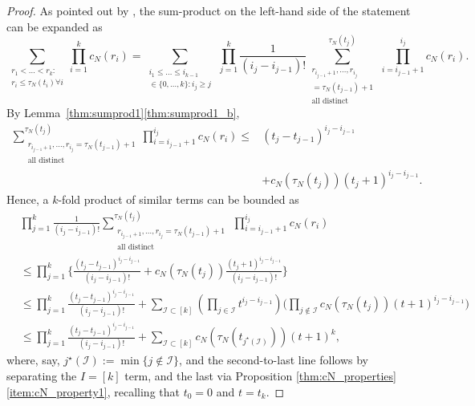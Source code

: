\documentclass[12pt,authoryear]{article}
\theoremstyle{definition}
\newcommand{\1}[1]{\mathbbm{1}_{#1}}
\begin{document}
\begin{proof}
As pointed out by \citet[p.\ 460]{mohle1999}, the sum-product on the left-hand side of the statement can be expanded as
\begin{equation*}
\sum_{\substack{r_1<\dots<r_k :\\ r_i\leq \tau_N(t_i) \forall i}} 
        \prod_{i=1}^k c_N(r_i)
= \sum_{\substack{i_1\leq \dots\leq i_{k-1}\\ \in \{0,\dots,k\} :
        i_j \geq j}} \, \prod_{j=1}^k \frac{1}{(i_j - i_{j-1})!}
        \sum_{\substack{ r_{i_{j-1}+1}, \ldots, r_{i_j} \\ = \tau_N(t_{j-1})+1 
        \\ \text{all distinct} }}^{\tau_N(t_j)}  
        \,\prod_{i=i_{j-1}+1}^{i_j} c_N(r_i) .
\end{equation*}
By Lemma~\ref{thm:sumprod1}\ref{thm:sumprod1_b},
\begin{align*}
\sum_{\substack{ r_{i_{j-1}+1}, \ldots, r_{i_j} = \tau_N(t_{j-1})+1 
        \\ \text{all distinct} }}^{\tau_N(t_j)}  
        \prod_{i=i_{j-1}+1}^{i_j} c_N(r_i) \leq{}& (t_j - t_{j-1})^{i_j - i_{j-1}} 
        \\& + c_N(\tau_N(t_j)) ( t_j +1 )^{i_j - i_{j-1}}.
\end{align*}
Hence, a $k$-fold product of similar terms can be bounded as
\begin{align*}
&\prod_{j=1}^k \frac{1}{(i_j - i_{j-1})!}
        \sum_{\substack{ r_{i_{j-1}+1}, \ldots, r_{i_j} = \tau_N(t_{j-1})+1 
        \\ \text{all distinct} }}^{\tau_N(t_j)}
        \,\prod_{i=i_{j-1}+1}^{i_j} c_N(r_i) \\
&\leq \prod_{j=1}^k \Bigg\{ \frac{(t_j - t_{j-1})^{i_j - i_{j-1}}}{(i_j - i_{j-1})!} + c_N(\tau_N(t_j)) \frac{( t_j +1 )^{i_j - i_{j-1}}}{(i_j - i_{j-1})!} \Bigg\} 
        \\
&\leq \prod_{j=1}^k \frac{(t_j - t_{j-1})^{i_j - i_{j-1}}}{(i_j - i_{j-1})!}  + \sum_{\mathcal{I} \subset [k]} \left( \prod_{j\in\mathcal{I}} 
        t^{i_j - i_{j-1}}\right)
        \Bigg( \prod_{j\notin\mathcal{I}} c_N(\tau_N(t_j))
        (t+1)^{i_j - i_{j-1}} \Bigg) \\
&\leq  \prod_{j=1}^k \frac{(t_j - t_{j-1})^{i_j - i_{j-1}}}{(i_j - i_{j-1})!}
        + \sum_{\mathcal{I} \subset [k]} c_N(\tau_N(t_{j^\star(\mathcal{I})})) 
        ( t+1 )^k,
\end{align*}
where, say, $j^\star(\mathcal{I}) := \min\{ j\notin\mathcal{I}\}$, and the second-to-last line follows by separating the $I = [k]$ term, and the last via Proposition \ref{thm:cN_properties}\ref{item:cN_property1}, recalling that $t_0 = 0$ and $t = t_k$.

\end{proof}
\end{document}
